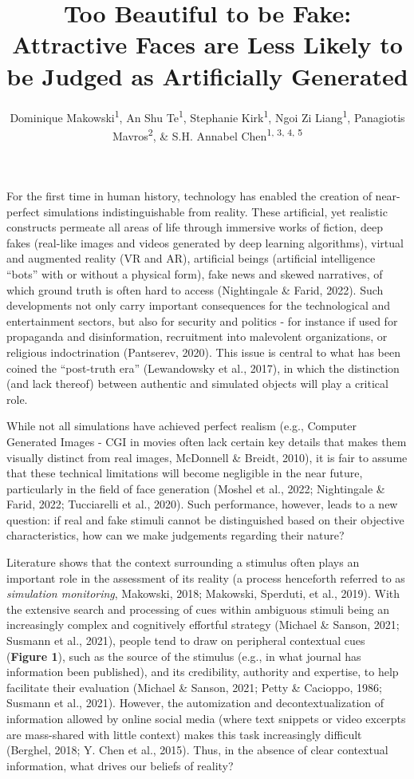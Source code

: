 \documentclass[
  man,floatsintext]{apa6}
\title{\textbf{Too Beautiful to be Fake: Attractive Faces are Less Likely to be Judged as Artificially Generated}}
\author{Dominique Makowski\textsuperscript{1}, An Shu Te\textsuperscript{1}, Stephanie Kirk\textsuperscript{1}, Ngoi Zi Liang\textsuperscript{1}, Panagiotis Mavros\textsuperscript{2}, \& S.H. Annabel Chen\textsuperscript{1, 3, 4, 5}}
\date{}
\affiliation{\vspace{0.5cm}\textsuperscript{1} School of Social Sciences, Nanyang Technological University, Singapore\\\textsuperscript{2} LKC Medicine, Nanyang Technological University, Singapore\\\textsuperscript{3} National Institute of Education, Singapore\\\textsuperscript{4} Centre for Research and Development in Learning, Nanyang Technological University, Singapore}
\begin{document}
\maketitle

For the first time in human history, technology has enabled the creation of near-perfect simulations indistinguishable from reality. These artificial, yet realistic constructs permeate all areas of life through immersive works of fiction, deep fakes (real-like images and videos generated by deep learning algorithms), virtual and augmented reality (VR and AR), artificial beings (artificial intelligence ``bots'' with or without a physical form), fake news and skewed narratives, of which ground truth is often hard to access (Nightingale \& Farid, 2022). Such developments not only carry important consequences for the technological and entertainment sectors, but also for security and politics - for instance if used for propaganda and disinformation, recruitment into malevolent organizations, or religious indoctrination (Pantserev, 2020). This issue is central to what has been coined the ``post-truth era'' (Lewandowsky et al., 2017), in which the distinction (and lack thereof) between authentic and simulated objects will play a critical role.

While not all simulations have achieved perfect realism (e.g., Computer Generated Images - CGI in movies often lack certain key details that makes them visually distinct from real images, McDonnell \& Breidt, 2010), it is fair to assume that these technical limitations will become negligible in the near future, particularly in the field of face generation (Moshel et al., 2022; Nightingale \& Farid, 2022; Tucciarelli et al., 2020). Such performance, however, leads to a new question: if real and fake stimuli cannot be distinguished based on their objective characteristics, how can we make judgements regarding their nature?

Literature shows that the context surrounding a stimulus often plays an important role in the assessment of its reality (a process henceforth referred to as \emph{simulation monitoring}, Makowski, 2018; Makowski, Sperduti, et al., 2019). With the extensive search and processing of cues within ambiguous stimuli being an increasingly complex and cognitively effortful strategy (Michael \& Sanson, 2021; Susmann et al., 2021), people tend to draw on peripheral contextual cues (\textbf{Figure 1}), such as the source of the stimulus (e.g., in what journal has information been published), and its credibility, authority and expertise, to help facilitate their evaluation (Michael \& Sanson, 2021; Petty \& Cacioppo, 1986; Susmann et al., 2021). However, the automization and decontextualization of information allowed by online social media (where text snippets or video excerpts are mass-shared with little context) makes this task increasingly difficult (Berghel, 2018; Y. Chen et al., 2015). Thus, in the absence of clear contextual information, what drives our beliefs of reality?
\end{document}
